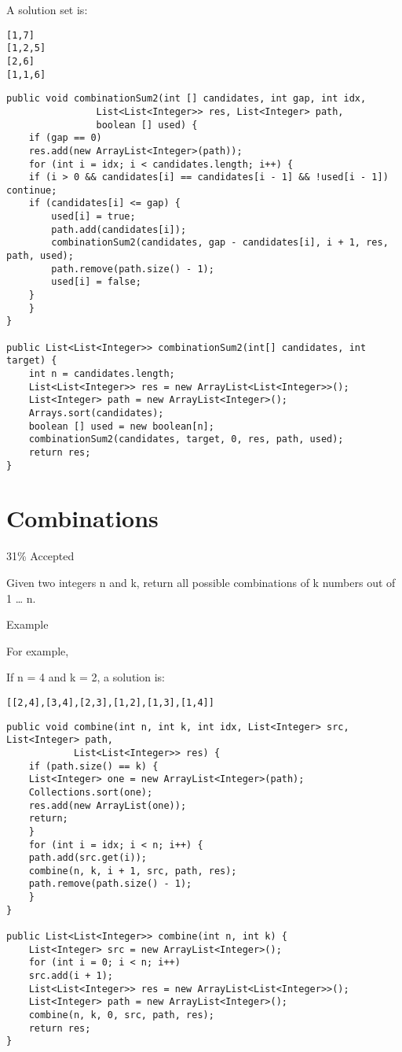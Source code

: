 \documentclass[12pt]{book}
\begin{document}
A solution set is: 
\lstset{language=java,label= ,caption= ,numbers=none}
\begin{lstlisting}
[1,7]
[1,2,5]
[2,6]
[1,1,6]
\end{lstlisting}
\lstset{language=java,label= ,caption= ,numbers=none}
\begin{lstlisting}
public void combinationSum2(int [] candidates, int gap, int idx, 
			    List<List<Integer>> res, List<Integer> path,
			    boolean [] used) {
    if (gap == 0) 
	res.add(new ArrayList<Integer>(path));
    for (int i = idx; i < candidates.length; i++) {
	if (i > 0 && candidates[i] == candidates[i - 1] && !used[i - 1]) continue;
	if (candidates[i] <= gap) {
	    used[i] = true;
	    path.add(candidates[i]);
	    combinationSum2(candidates, gap - candidates[i], i + 1, res, path, used);
	    path.remove(path.size() - 1);
	    used[i] = false;
	}
    }
}

public List<List<Integer>> combinationSum2(int[] candidates, int target) {
    int n = candidates.length;
    List<List<Integer>> res = new ArrayList<List<Integer>>();
    List<Integer> path = new ArrayList<Integer>();
    Arrays.sort(candidates);
    boolean [] used = new boolean[n];
    combinationSum2(candidates, target, 0, res, path, used);
    return res;
}
\end{lstlisting}
\chapter{Combinations}
\label{sec-22}

31\% Accepted

Given two integers n and k, return all possible combinations of k numbers out of 1 \ldots{} n.

Example

For example,

If n = 4 and k = 2, a solution is:
\lstset{language=java,label= ,caption= ,numbers=none}
\begin{lstlisting}
[[2,4],[3,4],[2,3],[1,2],[1,3],[1,4]]
\end{lstlisting}
\lstset{language=java,label= ,caption= ,numbers=none}
\begin{lstlisting}
public void combine(int n, int k, int idx, List<Integer> src, List<Integer> path,
		    List<List<Integer>> res) {
    if (path.size() == k) {
	List<Integer> one = new ArrayList<Integer>(path);
	Collections.sort(one);
	res.add(new ArrayList(one));
	return;
    }
    for (int i = idx; i < n; i++) {
	path.add(src.get(i));
	combine(n, k, i + 1, src, path, res);
	path.remove(path.size() - 1);
    }
}

public List<List<Integer>> combine(int n, int k) {
    List<Integer> src = new ArrayList<Integer>();
    for (int i = 0; i < n; i++) 
	src.add(i + 1);
    List<List<Integer>> res = new ArrayList<List<Integer>>();
    List<Integer> path = new ArrayList<Integer>();
    combine(n, k, 0, src, path, res);
    return res;
}
\end{lstlisting}
\end{document}
